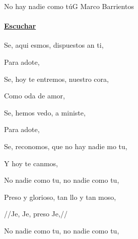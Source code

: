 \documentclass[12pt, spanish]{book}
\newcommand{\NotCCLIed}{\relax}
\begin{document}
    \begin{song}{No hay nadie como tú}{G}
        {} %
        {Marco Barrientos}
        {} %
        {} %
        \ifChordBk
        \paragraph{\mbox{}\hfill\protect\href{https://open.spotify.com/intl-es/track/1W1vJMrKPucMewFWZiBoeS}{Escuchar}\mbox{}\hfill}
        \fi


        \begin{SBOpGroup}
            Se,      aqui esmos,     dispuestos an ti,

            Para adote,

            Se,      hoy te entremos,    nuestro cora,

            Como oda de amor,

            Se,      hemos vedo,    a ministe,

            Para adote,

            Se,      reconomos,    que no hay nadie mo tu,

            Y hoy te canmos,
        \end{SBOpGroup}

        \begin{SBChorus}
            No  nadie como tu,      no  nadie como tu,

            Preso y glorioso,    tan llo y tan moso,

            //Je,    Je, preso Je,//
        \end{SBChorus}


        \begin{SBChorus}
            No  nadie como tu,      no  nadie como tu,


\end{SBChorus}
\end{song}
\end{document}
